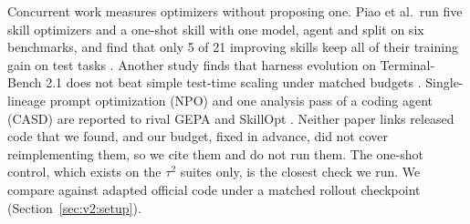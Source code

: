 Concurrent work measures optimizers without proposing one. Piao et al.\ run five skill optimizers and a one-shot skill with one model, agent and split on six benchmarks, and find that only 5 of 21 improving skills keep all of their training gain on test tasks \citep{piao2026skillsgeneralize}. Another study finds that harness evolution on Terminal-Bench 2.1 does not beat simple test-time scaling under matched budgets \citep{rethinkharness}. Single-lineage prompt optimization (NPO) and one analysis pass of a coding agent (CASD) are reported to rival GEPA and SkillOpt \citep{naiveprompt,codingagentsopt}. Neither paper links released code that we found, and our budget, fixed in advance, did not cover reimplementing them, so we cite them and do not run them. The one-shot control, which exists on the $\tau^2$ suites only, is the closest check we run. We compare against adapted official code under a matched rollout checkpoint (Section~\ref{sec:v2:setup}).
